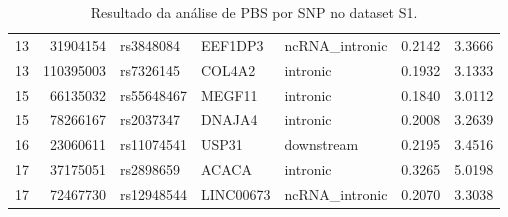 \begin{table}[!htbp]
{\begin{tabular}[t]{crlllrr}
13 & 31904154 & rs3848084 & EEF1DP3 & ncRNA\_intronic & 0.2142 & 3.3666\\
13 & 110395003 & rs7326145 & COL4A2 & intronic & 0.1932 & 3.1333\\
15 & 66135032 & rs55648467 & MEGF11 & intronic & 0.1840 & 3.0112\\
15 & 78266167 & rs2037347 & DNAJA4 & intronic & 0.2008 & 3.2639\\
16 & 23060611 & rs11074541 & USP31 & downstream & 0.2195 & 3.4516\\
17 & 37175051 & rs2898659 & ACACA & intronic & 0.3265 & 5.0198\\
17 & 72467730 & rs12948544 & LINC00673 & ncRNA\_intronic & 0.2070 & 3.3038\\
\bottomrule
\end{tabular}}

\caption{Resultado da análise de PBS por SNP no dataset S1.}
\label{tab:ds1_pbsw_persnp}

\end{table}
